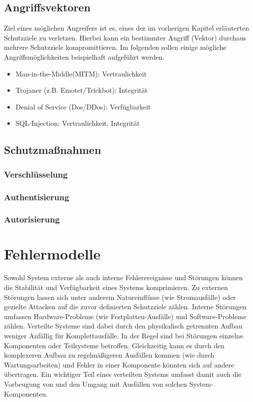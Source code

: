 \documentclass[12pt,a4paper,parskip=half]{scrreprt}
\begin{document}
\section{Angriffsvektoren}

Ziel eines möglichen Angreifers ist es, eines der im vorherigen Kapitel erläuterten Schutzziele zu verletzen. Hierbei kann ein bestimmter Angriff (Vektor) durchaus mehrere Schutzziele kompromittieren. Im folgenden sollen einige mögliche Angriffsmöglichkeiten beispielhaft aufgeführt werden.

\begin{itemize}
	\item Man-in-the-Middle(MITM): Vertraulichkeit
	\item Trojaner (z.B. Emotet/Trickbot): Integrität
	\item Denial of Service (Dos/DDos): Verfügbarkeit
	\item SQL-Injection: Vertraulichkeit, Integrität
\end{itemize}



\section{Schutzmaßnahmen}


\subsection{Verschlüsselung}


\subsection{Authentisierung}


\subsection{Autorisierung}


\chapter{Fehlermodelle}
Sowohl System externe als auch interne Fehlerereignisse und Störungen können die Stabilität und Verfügbarkeit eines Systems komprimieren. Zu externen Störungen lassen sich unter anderem Natureinflüsse (wie Stromausfälle) oder gezielte Attacken auf die zuvor definierten Schutzziele zählen. Interne Störungen umfassen Hardware-Probleme (wie Festplatten-Ausfälle) und Software-Probleme zählen. Verteilte Systeme sind dabei durch den physikalisch getrennten Aufbau weniger Anfällig für Komplettausfälle. In der Regel sind bei Störungen einzelne Komponenten oder Teilsysteme betroffen. Gleichzeitig kann es durch den komplexeren Aufbau zu regelmäßigeren Ausfällen kommen (wie durch Wartungsarbeiten) und Fehler in einer Komponente könnten sich auf andere übertragen. Ein wichtiger Teil eines verteilten Systems umfasst damit auch die Vorbeugung von und den Umgang mit Ausfällen von solchen System-Komponenten.
\end{document}

